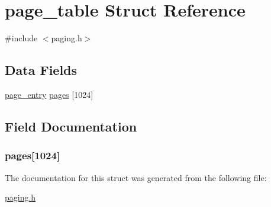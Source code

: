 \hypertarget{structpage__table}{}\section{page\+\_\+table Struct Reference}
\label{structpage__table}


{\ttfamily \#include $<$paging.\+h$>$}

\subsection*{Data Fields}
\begin{DoxyCompactItemize}
\item 
\hyperlink{structpage__entry}{page\+\_\+entry} \hyperlink{structpage__table_a5cca43bbc67fbbb87eedf886c6e32efb}{pages} \mbox{[}1024\mbox{]}
\end{DoxyCompactItemize}


\subsection{Field Documentation}
\hypertarget{structpage__table_a5cca43bbc67fbbb87eedf886c6e32efb}{}
\subsubsection[{pages}]{ pages\mbox{[}1024\mbox{]}}\label{structpage__table_a5cca43bbc67fbbb87eedf886c6e32efb}


The documentation for this struct was generated from the following file\+:\begin{DoxyCompactItemize}
\item 
\hyperlink{paging_8h}{paging.\+h}\end{DoxyCompactItemize}
